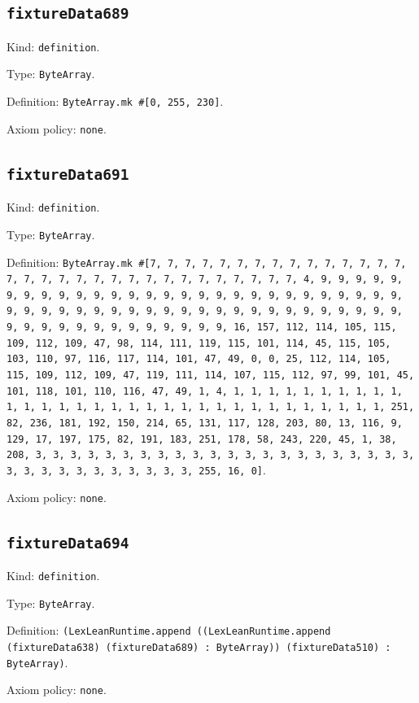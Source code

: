 \documentclass[11pt]{article}
\begin{document}
\subsection*{\texttt{fixtureData689}}
\noindent Kind: \texttt{definition}.\par
\noindent Type: \texttt{ByteArray}.\par
\noindent Definition: \texttt{ByteArray.mk \#[0, 255, 230]}.\par
\noindent Axiom policy: \texttt{none}.\par
\subsection*{\texttt{fixtureData691}}
\noindent Kind: \texttt{definition}.\par
\noindent Type: \texttt{ByteArray}.\par
\noindent Definition: \texttt{ByteArray.mk \#[7, 7, 7, 7, 7, 7, 7, 7, 7, 7, 7, 7, 7, 7, 7, 7, 7, 7, 7, 7, 7, 7, 7, 7, 7, 7, 7, 7, 7, 7, 7, 7, 4, 9, 9, 9, 9, 9, 9, 9, 9, 9, 9, 9, 9, 9, 9, 9, 9, 9, 9, 9, 9, 9, 9, 9, 9, 9, 9, 9, 9, 9, 9, 9, 9, 9, 9, 9, 9, 9, 9, 9, 9, 9, 9, 9, 9, 9, 9, 9, 9, 9, 9, 9, 9, 9, 9, 9, 9, 9, 9, 9, 9, 9, 9, 9, 9, 16, 157, 112, 114, 105, 115, 109, 112, 109, 47, 98, 114, 111, 119, 115, 101, 114, 45, 115, 105, 103, 110, 97, 116, 117, 114, 101, 47, 49, 0, 0, 25, 112, 114, 105, 115, 109, 112, 109, 47, 119, 111, 114, 107, 115, 112, 97, 99, 101, 45, 101, 118, 101, 110, 116, 47, 49, 1, 4, 1, 1, 1, 1, 1, 1, 1, 1, 1, 1, 1, 1, 1, 1, 1, 1, 1, 1, 1, 1, 1, 1, 1, 1, 1, 1, 1, 1, 1, 1, 1, 1, 251, 82, 236, 181, 192, 150, 214, 65, 131, 117, 128, 203, 80, 13, 116, 9, 129, 17, 197, 175, 82, 191, 183, 251, 178, 58, 243, 220, 45, 1, 38, 208, 3, 3, 3, 3, 3, 3, 3, 3, 3, 3, 3, 3, 3, 3, 3, 3, 3, 3, 3, 3, 3, 3, 3, 3, 3, 3, 3, 3, 3, 3, 3, 3, 3, 255, 16, 0]}.\par
\noindent Axiom policy: \texttt{none}.\par
\subsection*{\texttt{fixtureData694}}
\noindent Kind: \texttt{definition}.\par
\noindent Type: \texttt{ByteArray}.\par
\noindent Definition: \texttt{(LexLeanRuntime.append ((LexLeanRuntime.append (fixtureData638) (fixtureData689) : ByteArray)) (fixtureData510) : ByteArray)}.\par
\noindent Axiom policy: \texttt{none}.\par
\end{document}
